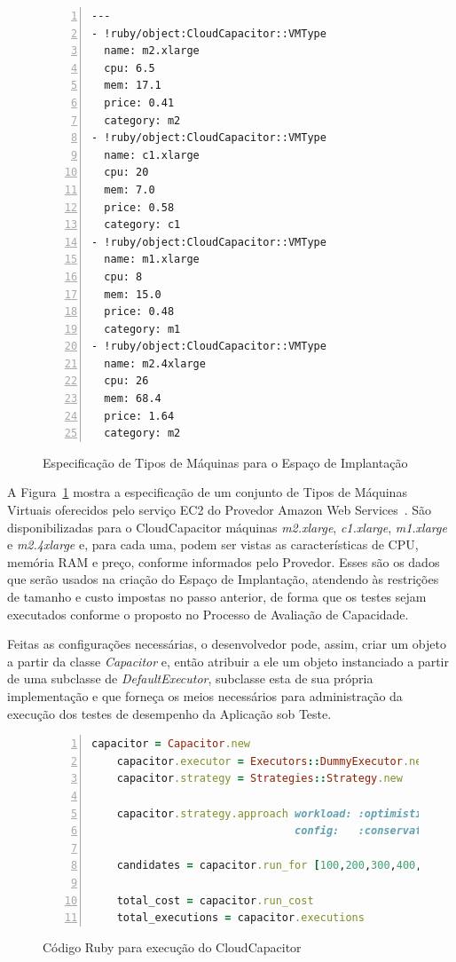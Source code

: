 \begin{figure}[h]
  \caption{\label{fig:depspace}Especificação de Tipos de Máquinas para o Espaço de Implantação}
 \begin{lstlisting}[linewidth=\textwidth,xleftmargin=.04\textwidth, numbers=left]
---
- !ruby/object:CloudCapacitor::VMType
  name: m2.xlarge
  cpu: 6.5
  mem: 17.1
  price: 0.41
  category: m2
- !ruby/object:CloudCapacitor::VMType
  name: c1.xlarge
  cpu: 20
  mem: 7.0
  price: 0.58
  category: c1
- !ruby/object:CloudCapacitor::VMType
  name: m1.xlarge
  cpu: 8
  mem: 15.0
  price: 0.48
  category: m1
- !ruby/object:CloudCapacitor::VMType
  name: m2.4xlarge
  cpu: 26
  mem: 68.4
  price: 1.64
  category: m2
  \end{lstlisting}
\end{figure}

A Figura~\ref{fig:depspace} mostra a especificação de um conjunto de Tipos de
Máquinas Virtuais oferecidos pelo serviço EC2 do Provedor Amazon Web 
Services~\cite{ec2}. São disponibilizadas para o CloudCapacitor máquinas 
\emph{m2.xlarge}, \emph{c1.xlarge}, \emph{m1.xlarge} e \emph{m2.4xlarge} e, para
cada uma, podem ser vistas as características de CPU, memória RAM e preço, conforme
informados pelo Provedor. Esses são os dados que serão usados na criação do Espaço
de Implantação, atendendo às restrições de tamanho e custo impostas no passo 
anterior, de forma que os testes sejam executados conforme o proposto
no Processo de Avaliação de Capacidade.

Feitas as configurações necessárias, o desenvolvedor pode, assim, criar um objeto 
a partir da classe \emph{Capacitor} e, então atribuir a ele um objeto instanciado
a partir de uma subclasse de \emph{DefaultExecutor}, subclasse esta de sua própria
implementação e que forneça os meios necessários para administração da execução
dos testes de desempenho da Aplicação sob Teste.

\begin{figure}[h]
  \caption{\label{fig:mincode}Código Ruby para execução do CloudCapacitor}
 \begin{lstlisting}[language=Ruby,linewidth=\textwidth,xleftmargin=.04\textwidth, numbers=left]
    capacitor = Capacitor.new
    capacitor.executor = Executors::DummyExecutor.new
    capacitor.strategy = Strategies::Strategy.new

    capacitor.strategy.approach workload: :optimistic,
                                config:   :conservative

    candidates = capacitor.run_for [100,200,300,400,500]
    
    total_cost = capacitor.run_cost
    total_executions = capacitor.executions  
 \end{lstlisting}
\end{figure}


